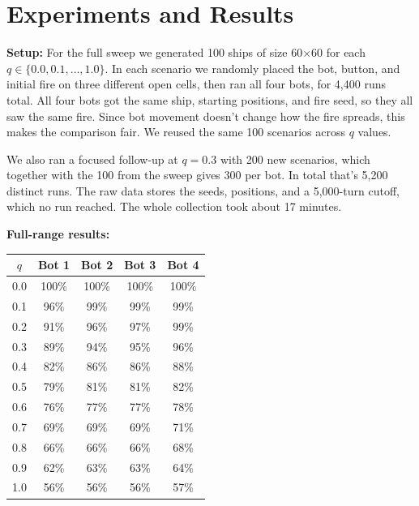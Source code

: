 \documentclass[11pt]{article}
\begin{document}
\section{Experiments and Results}

\textbf{Setup:} For the full sweep we generated 100 ships of size 60$\times$60 for each $q \in \{0.0, 0.1, \dots, 1.0\}$. In each scenario we randomly placed the bot, button, and initial fire on three different open cells, then ran all four bots, for 4,400 runs total. All four bots got the same ship, starting positions, and fire seed, so they all saw the same fire. Since bot movement doesn't change how the fire spreads, this makes the comparison fair. We reused the same 100 scenarios across $q$ values.

We also ran a focused follow-up at $q = 0.3$ with 200 new scenarios, which together with the 100 from the sweep gives 300 per bot. In total that's 5,200 distinct runs. The raw data stores the seeds, positions, and a 5,000-turn cutoff, which no run reached. The whole collection took about 17 minutes.

\begin{samepage}
\textbf{Full-range results:}

\begin{center}
\begin{tabular}{c|cccc}
\toprule
$q$ & Bot 1 & Bot 2 & Bot 3 & Bot 4 \\
\midrule
0.0 & 100\% & 100\% & 100\% & 100\% \\
0.1 & 96\% & 99\% & 99\% & 99\% \\
0.2 & 91\% & 96\% & 97\% & 99\% \\
0.3 & 89\% & 94\% & 95\% & 96\% \\
0.4 & 82\% & 86\% & 86\% & 88\% \\
0.5 & 79\% & 81\% & 81\% & 82\% \\
0.6 & 76\% & 77\% & 77\% & 78\% \\
0.7 & 69\% & 69\% & 69\% & 71\% \\
0.8 & 66\% & 66\% & 66\% & 68\% \\
0.9 & 62\% & 63\% & 63\% & 64\% \\
1.0 & 56\% & 56\% & 56\% & 57\% \\
\bottomrule
\end{tabular}
\end{center}
\end{samepage}
\end{document}
